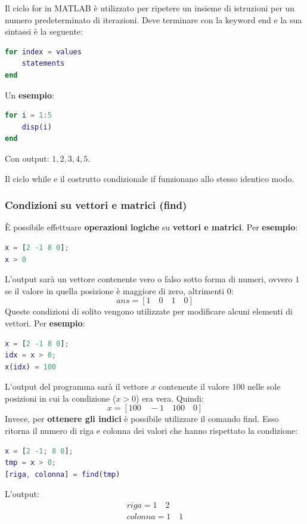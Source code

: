 \documentclass[a4paper]{article}
\begin{document}
	Il ciclo \textcolor{Red3}{\textsf{for}} in MATLAB è utilizzato per ripetere un insieme di istruzioni per un numero predeterminato di iterazioni. Deve terminare con la keyword \textsf{end} e la sua sintassi è la seguente:
	\begin{lstlisting}[language=MATLAB]
for index = values
	statements
end	\end{lstlisting}
	Un \textcolor{Green4}{\textbf{esempio}}:
	\begin{lstlisting}[language=MATLAB]
for i = 1:5
	disp(i)
end	\end{lstlisting}
	Con output: $1,2,3,4,5$.\newline
	
	\noindent
	Il ciclo \textcolor{Red3}{\textsf{while}} e il costrutto condizionale \textsf{if} funzionano allo stesso identico modo.\newpage
	
	\subsubsection{Condizioni su vettori e matrici (\textsf{find})}
	
	È possibile effettuare \textbf{operazioni logiche} su \textbf{vettori e matrici}. Per \textcolor{Green4}{\textbf{esempio}}:
	\begin{lstlisting}[language=MATLAB]
x = [2 -1 8 0];
x > 0\end{lstlisting}
	L'output sarà un vettore contenente vero o falso sotto forma di numeri, ovvero $1$ se il valore in quella posizione è maggiore di zero, altrimenti $0$:
	\begin{equation*}
		ans = \left[1 \hspace{1em} 0 \hspace{1em} 1 \hspace{1em} 0\right]
	\end{equation*}
	Queste condizioni di solito vengono utilizzate per modificare alcuni elementi di vettori. Per \textcolor{Green4}{\textbf{esempio}}:
	\begin{lstlisting}[language=MATLAB]
x = [2 -1 8 0];
idx = x > 0;
x(idx) = 100 \end{lstlisting}
	L'output del programma sarà il vettore $x$ contenente il valore $100$ nelle sole posizioni in cui la condizione ($x>0$) era vera. Quindi:
	\begin{equation*}
		x = \left[100 \hspace{1em} -1 \hspace{1em} 100 \hspace{1em} 0\right]
	\end{equation*}
	Invece, per \textbf{ottenere gli indici} è possibile utilizzare il comando \textsf{find}. Esso ritorna il numero di riga e colonna dei valori che hanno rispettato la condizione:
	\begin{lstlisting}[language=MATLAB]
x = [2 -1; 8 0];
tmp = x > 0;
[riga, colonna] = find(tmp)\end{lstlisting}
	L'output:
	\begin{gather*}
		riga = 1 \hspace{1em} 2 \\
		colonna = 1 \hspace{1em} 1
	\end{gather*}\newpage
\end{document}
